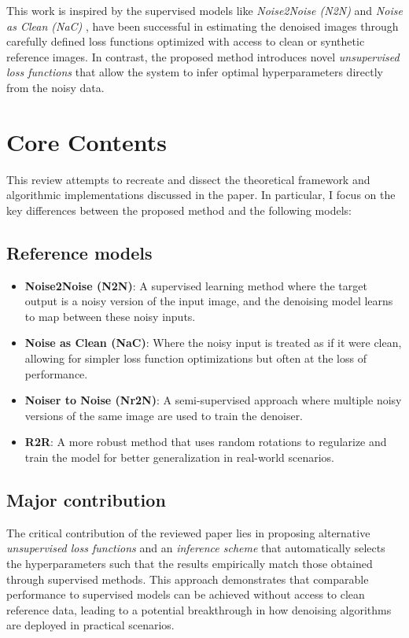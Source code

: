 \documentclass[
]{agujournal2019}
\providecommand{\tightlist}{%
  \setlength{\itemsep}{0pt}\setlength{\parskip}{0pt}}\usepackage{longtable,booktabs,array}
\begin{document}
This work is inspired by the supervised models like \emph{Noise2Noise
(N2N)} and \emph{Noise as Clean (NaC)} , have been successful in
estimating the denoised images through carefully defined loss functions
optimized with access to clean or synthetic reference images. In
contrast, the proposed method introduces novel \emph{unsupervised loss
functions} that allow the system to infer optimal hyperparameters
directly from the noisy data.

\section{Core Contents}\label{core-contents}

This review attempts to recreate and dissect the theoretical framework
and algorithmic implementations discussed in the paper. In particular, I
focus on the key differences between the proposed method and the
following models:

\subsection{Reference models}\label{reference-models}

\begin{itemize}
\tightlist
\item
  \textbf{Noise2Noise (N2N)}: A supervised learning method where the
  target output is a noisy version of the input image, and the denoising
  model learns to map between these noisy inputs.
\item
  \textbf{Noise as Clean (NaC)}: Where the noisy input is treated as if
  it were clean, allowing for simpler loss function optimizations but
  often at the loss of performance.
\item
  \textbf{Noiser to Noise (Nr2N)}: A semi-supervised approach where
  multiple noisy versions of the same image are used to train the
  denoiser.
\item
  \textbf{R2R}: A more robust method that uses random rotations to
  regularize and train the model for better generalization in real-world
  scenarios.
\end{itemize}

\subsection{Major contribution}\label{major-contribution}

The critical contribution of the reviewed paper lies in proposing
alternative \emph{unsupervised loss functions} and an \emph{inference
scheme} that automatically selects the hyperparameters such that the
results empirically match those obtained through supervised methods.
This approach demonstrates that comparable performance to supervised
models can be achieved without access to clean reference data, leading
to a potential breakthrough in how denoising algorithms are deployed in
practical scenarios.
\end{document}
